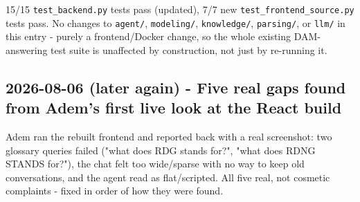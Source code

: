 15/15 \texttt{test\_\allowbreak{}backend.py} tests pass (updated), 7/7 new \texttt{test\_\allowbreak{}frontend\_\allowbreak{}source.py} tests pass. No changes to \texttt{agent/\allowbreak{}}, \texttt{modeling/\allowbreak{}}, \texttt{knowledge/\allowbreak{}}, \texttt{parsing/\allowbreak{}}, or \texttt{llm/\allowbreak{}} in this entry - purely a frontend/Docker change, so the whole existing DAM-answering test suite is unaffected by construction, not just by re-running it.

\subsection*{2026-08-06 (later again) - Five real gaps found from Adem's first live look at the React build}
Adem ran the rebuilt frontend and reported back with a real screenshot: two glossary queries failed ("what does RDG stands for?", "what does RDNG STANDS for?"), the chat felt too wide/sparse with no way to keep old conversations, and the agent read as flat/scripted. All five real, not cosmetic complaints - fixed in order of how they were found.


